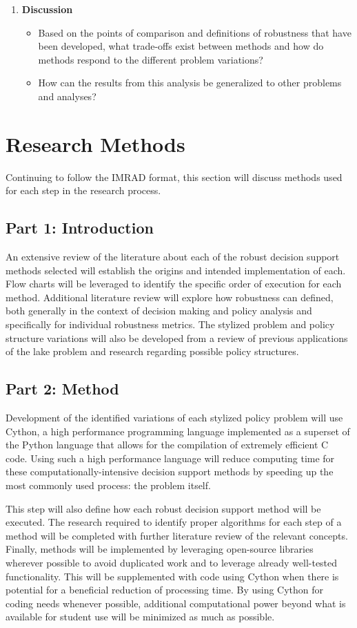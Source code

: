 \begin{enumerate}
    \item \textbf{Discussion}
        \begin{itemize}[label={--}]
            \item Based on the points of comparison and definitions of robustness that have been developed, what trade-offs exist between methods and how do methods respond to the different problem variations?
            \item How can the results from this analysis be generalized to other problems and analyses? 
        \end{itemize}
\end{enumerate}

\section{Research Methods}\label{research methods}
Continuing to follow the IMRAD format, this section will discuss methods used for each step in the research process. 

\subsection{Part 1: Introduction}
An extensive review of the literature about each of the robust decision support methods selected will establish the origins and intended implementation of each. Flow charts will be leveraged to identify the specific order of execution for each method. Additional literature review will explore how robustness can defined, both generally in the context of decision making and policy analysis and specifically for individual robustness metrics. The stylized problem and policy structure variations will also be developed from a review of previous applications of the lake problem and research regarding possible policy structures.

\subsection{Part 2: Method}
Development of the identified variations of each stylized policy problem will use Cython, a high performance programming language implemented as a superset of the Python language that allows for the compilation of extremely efficient C code. Using such a high performance language will reduce computing time for these computationally-intensive decision support methods by speeding up the most commonly used process: the problem itself.

This step will also define how each robust decision support method will be executed. The research required to identify proper algorithms for each step of a method will be completed with further literature review of the relevant concepts. Finally, methods will be implemented by leveraging open-source libraries wherever possible to avoid duplicated work and to leverage already well-tested functionality. This will be supplemented with code using Cython when there is potential for a beneficial reduction of processing time. By using Cython for coding needs whenever possible, additional computational power beyond what is available for student use will be minimized as much as possible.

